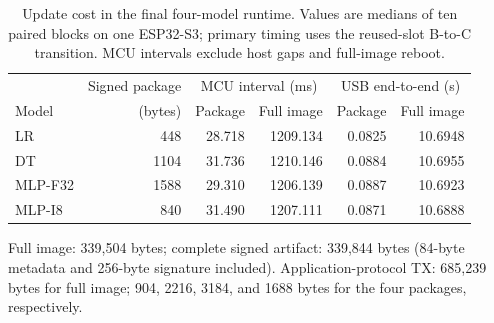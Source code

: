 \begin{table}[!htbp]
\caption{Update cost in the final four-model runtime. Values are medians of ten paired blocks on one ESP32-S3; primary timing uses the reused-slot B-to-C transition. MCU intervals exclude host gaps and full-image reboot.}\label{tab:hardware-cost}
\centering\small
\begin{tabular}{lrrrrr}
\toprule
 & Signed package & \multicolumn{2}{c}{MCU interval (ms)} & \multicolumn{2}{c}{USB end-to-end (s)}\\
Model & (bytes) & Package & Full image & Package & Full image\\
\midrule
LR & 448 & 28.718 & 1209.134 & 0.0825 & 10.6948\\
DT & 1104 & 31.736 & 1210.146 & 0.0884 & 10.6955\\
MLP-F32 & 1588 & 29.310 & 1206.139 & 0.0887 & 10.6923\\
MLP-I8 & 840 & 31.490 & 1207.111 & 0.0871 & 10.6888\\
\bottomrule
\end{tabular}
\par\smallskip\footnotesize Full image: 339,504 bytes; complete signed artifact: 339,844 bytes (84-byte metadata and 256-byte signature included). Application-protocol TX: 685,239 bytes for full image; 904, 2216, 3184, and 1688 bytes for the four packages, respectively.
\end{table}
